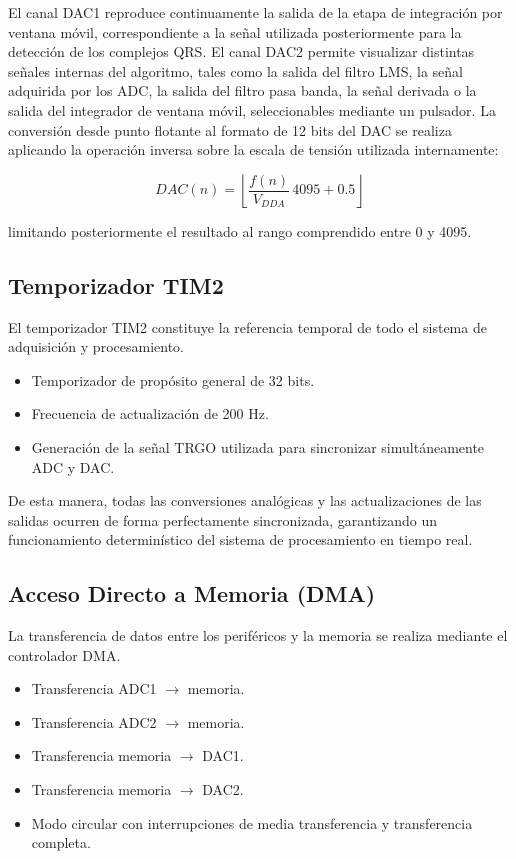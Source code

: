 \documentclass[12pt]{article}
\begin{document}
		El canal DAC1 reproduce continuamente la salida de la etapa de integración por ventana móvil, correspondiente a la señal utilizada posteriormente para la detección de los complejos QRS. El canal DAC2 permite visualizar distintas señales internas del algoritmo, tales como la salida del filtro LMS, la señal adquirida por los ADC, la salida del filtro pasa banda, la señal derivada o la salida del integrador de ventana móvil, seleccionables mediante un pulsador.
		La conversión desde punto flotante al formato de 12 bits del DAC se realiza aplicando la operación inversa sobre la escala de tensión utilizada internamente:

		\[
		DAC(n)=\left\lfloor \frac{f(n)}{V_{DDA}}\,4095+0.5\right\rfloor
		\]

		limitando posteriormente el resultado al rango comprendido entre 0 y 4095.

		\subsection{Temporizador TIM2}

		El temporizador TIM2 constituye la referencia temporal de todo el sistema de adquisición y procesamiento.

		\begin{itemize}
			\item Temporizador de propósito general de 32 bits.
			\item Frecuencia de actualización de 200 Hz.
			\item Generación de la señal TRGO utilizada para sincronizar simultáneamente ADC y DAC.
		\end{itemize}

		De esta manera, todas las conversiones analógicas y las actualizaciones de las salidas ocurren de forma perfectamente sincronizada, garantizando un funcionamiento determinístico del sistema de procesamiento en tiempo real.

		\subsection{Acceso Directo a Memoria (DMA)}

		La transferencia de datos entre los periféricos y la memoria se realiza mediante el controlador DMA.

		\begin{itemize}
			\item Transferencia ADC1 $\rightarrow$ memoria.
			\item Transferencia ADC2 $\rightarrow$ memoria.
			\item Transferencia memoria $\rightarrow$ DAC1.
			\item Transferencia memoria $\rightarrow$ DAC2.
			\item Modo circular con interrupciones de media transferencia y transferencia completa.
		\end{itemize}
\end{document}
